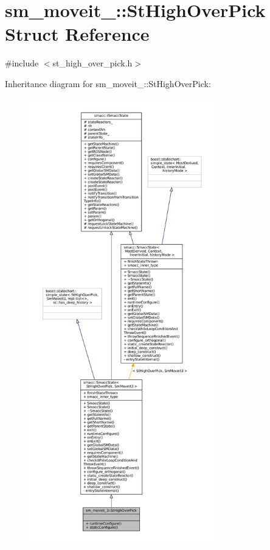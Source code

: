 \hypertarget{structsm__moveit__3_1_1StHighOverPick}{}\section{sm\+\_\+moveit\+\_\+:\+:St\+High\+Over\+Pick Struct Reference}
\label{structsm__moveit__3_1_1StHighOverPick}


{\ttfamily \#include $<$st\+\_\+high\+\_\+over\+\_\+pick.\+h$>$}



Inheritance diagram for sm\+\_\+moveit\+\_\+:\+:St\+High\+Over\+Pick\+:
\nopagebreak
\begin{figure}[H]
\begin{center}
\leavevmode
\includegraphics[height=550pt]{structsm__moveit__3_1_1StHighOverPick__inherit__graph}
\end{center}
\end{figure}


